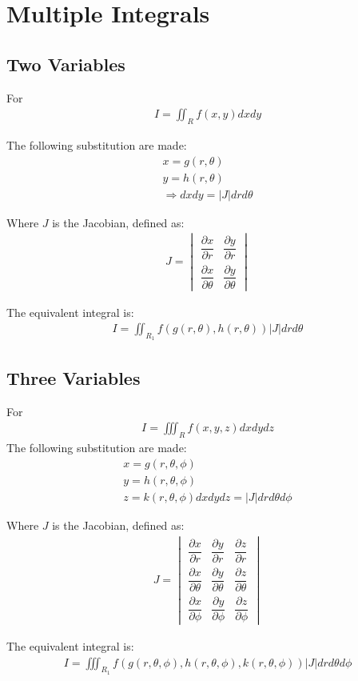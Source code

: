 \documentclass[../main.tex]{subfile}
\begin{document}
\chapter{Multiple Integrals}
\section{Two Variables}
For
\begin{align}
    I = \iint_R f(x,y) dxdy
\end{align}

The following substitution are made:
\begin{align}
    x = g(r,\theta)\\
    y = h(r,\theta)\\
    \Rightarrow dx dy = \lvert J \rvert dr d\theta
\end{align}

Where $J$ is the Jacobian, defined as:
\begin{align}
    J = \begin{vmatrix}
            \dfrac{\partial x}{\partial r} & \dfrac{\partial y}{\partial r}\\
            \dfrac{\partial x}{\partial \theta} & \dfrac{\partial y}{\partial \theta}
        \end{vmatrix}
\end{align}

The equivalent integral is:
\begin{align}
    I=\iint_{R_1} f(g(r,\theta),h(r,\theta))\lvert J \rvert drd\theta
\end{align}

\section{Three Variables}
For
\begin{align}
    I=\iiint_R f(x,y,z) dxdydz
\end{align}
The following substitution are made:
\begin{align}
    x = g(r,\theta,\phi)\\
    y = h(r,\theta,\phi)\\
    z = k(r,\theta,\phi)
    dx dy dz = \lvert J \rvert dr d\theta d\phi
\end{align}

Where $J$ is the Jacobian, defined as:
\begin{align}
    J = \begin{vmatrix}
            \dfrac{\partial x}{\partial r}&\dfrac{\partial y}{\partial r}&\dfrac{\partial z}{\partial r}\\
            \dfrac{\partial x}{\partial \theta}&\dfrac{\partial y}{\partial \theta}&\dfrac{\partial z}{\partial \theta}\\
            \dfrac{\partial x}{\partial \phi}&\dfrac{\partial y}{\partial \phi}&\dfrac{\partial z}{\partial \phi}
        \end{vmatrix}
\end{align}

The equivalent integral is:
\begin{align}
    I=\iiint_{R_1} f(g(r,\theta,\phi),h(r,\theta,\phi),k(r,\theta,\phi))\lvert J \rvert dr d\theta d\phi
\end{align}
\end{document}
